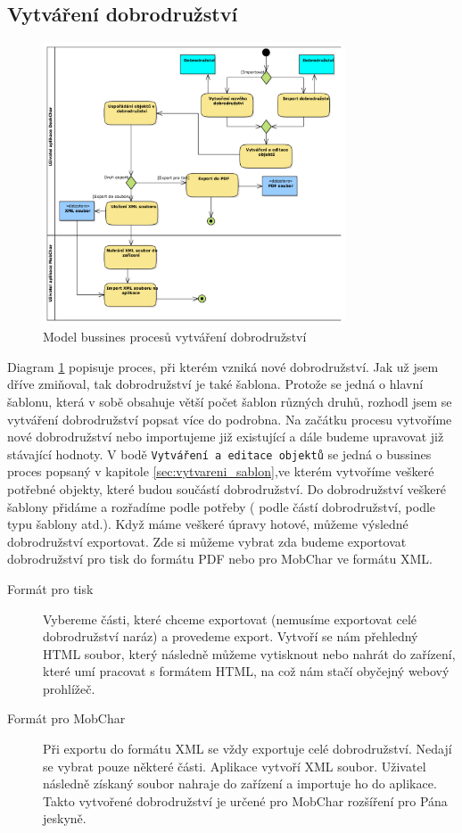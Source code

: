 \documentclass[thesis=B,czech]{resources/FITthesis}[2012/06/26]
\begin{document}
\subsection{Vytváření dobrodružství}
\begin{figure}\centering
	\includegraphics[width=0.8\textwidth]{images/business_dobrodruzstvi}
	\caption[Business proces vytváření dobrodružství]{Model bussines procesů vytváření dobrodružství}\label{fig:bp_dobrodruzsvi}
\end{figure}
Diagram \ref{fig:bp_dobrodruzsvi} popisuje proces, při kterém vzniká nové dobrodružství. Jak už jsem dříve zmiňoval, tak dobrodružství je také šablona. Protože se jedná o hlavní šablonu, která v sobě obsahuje větší počet šablon různých druhů, rozhodl jsem se vytváření dobrodružství popsat více do podrobna. Na začátku procesu vytvoříme nové dobrodružství nebo importujeme již existující a dále budeme upravovat již stávající hodnoty. V bodě \texttt{Vytváření a editace objektů} se jedná o bussines proces popsaný v kapitole \ref{sec:vytvareni_sablon},ve kterém vytvoříme veškeré potřebné objekty, které budou součástí dobrodružství. Do dobrodružství veškeré šablony přidáme a rozřadíme podle potřeby ( podle částí dobrodružství, podle typu šablony atd.). Když máme veškeré úpravy hotové, můžeme výsledné dobrodružství exportovat. Zde si můžeme vybrat zda budeme exportovat dobrodružství pro tisk do formátu PDF nebo pro MobChar ve formátu XML.
\begin{description}

\item[Formát pro tisk] Vybereme části, které chceme exportovat (nemusíme exportovat celé dobrodružství naráz) a provedeme export. Vytvoří se nám přehledný HTML soubor, který následně můžeme vytisknout nebo nahrát do zařízení, které umí pracovat s formátem HTML, na což nám stačí obyčejný webový prohlížeč.

\item[Formát pro MobChar] Při exportu do formátu XML se vždy exportuje celé dobrodružství. Nedají se vybrat pouze některé části. Aplikace vytvoří XML soubor. Uživatel následně získaný soubor nahraje do zařízení a importuje ho do aplikace. 
Takto vytvořené dobrodružství je určené pro MobChar rozšíření pro Pána jeskyně.

\end{description}
\end{document}
